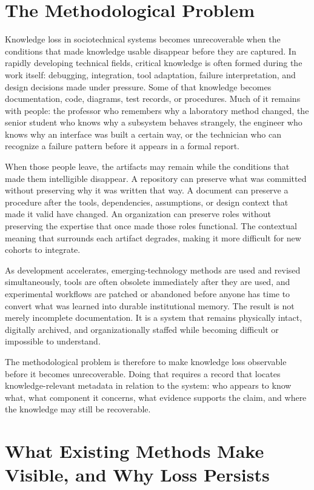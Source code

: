 \documentclass[preprints,article,submit,moreauthors]{Definitions/mdpi}
\begin{document}
\section{The Methodological Problem}\label{sec:1}

Knowledge loss in sociotechnical systems becomes unrecoverable when the conditions that made knowledge usable disappear before they are captured. In rapidly developing technical fields, critical knowledge is often formed during the work itself: debugging, integration, tool adaptation, failure interpretation, and design decisions made under pressure. Some of that knowledge becomes documentation, code, diagrams, test records, or procedures. Much of it remains with people: the professor who remembers why a laboratory method changed, the senior student who knows why a subsystem behaves strangely, the engineer who knows why an interface was built a certain way, or the technician who can recognize a failure pattern before it appears in a formal report.

When those people leave, the artifacts may remain while the conditions that made them intelligible disappear. A repository can preserve what was committed without preserving why it was written that way. A document can preserve a procedure after the tools, dependencies, assumptions, or design context that made it valid have changed. An organization can preserve roles without preserving the expertise that once made those roles functional. The contextual meaning that surrounds each artifact degrades, making it more difficult for new cohorts to integrate.

As development accelerates, emerging-technology methods are used and revised simultaneously, tools are often obsolete immediately after they are used, and experimental workflows are patched or abandoned before anyone has time to convert what was learned into durable institutional memory. The result is not merely incomplete documentation. It is a system that remains physically intact, digitally archived, and organizationally staffed while becoming difficult or impossible to understand.

The methodological problem is therefore to make knowledge loss observable before it becomes unrecoverable. Doing that requires a record that locates knowledge-relevant metadata in relation to the system: who appears to know what, what component it concerns, what evidence supports the claim, and where the knowledge may still be recoverable.

\section{What Existing Methods Make Visible, and Why Loss Persists}\label{sec:2}
\end{document}
